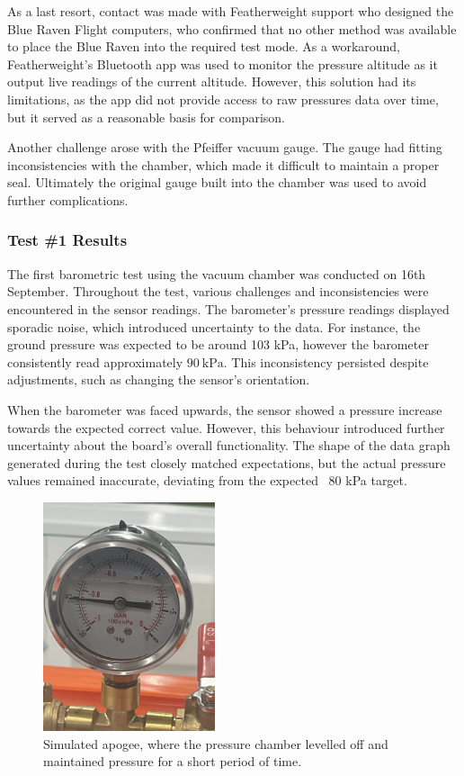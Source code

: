 As a last resort, contact was made with Featherweight support who designed the Blue Raven Flight computers, who confirmed that no other method was available to place the Blue Raven into the required test mode. As a workaround, Featherweight’s Bluetooth app was used to monitor the pressure altitude as it output live readings of the current altitude. However, this solution had its limitations, as the app did not provide access to raw pressures data over time, but it served as a reasonable basis for comparison.  

Another challenge arose with the Pfeiffer vacuum gauge. The gauge had fitting inconsistencies with the chamber, which made it difficult to maintain a proper seal. Ultimately the original gauge built into the chamber was used to avoid further complications.

\subsubsection{Test \#1 Results}
The first barometric test using the vacuum chamber was conducted on 16th September. Throughout the test, various challenges and inconsistencies were encountered in the sensor readings. The barometer's pressure readings displayed sporadic noise, which introduced uncertainty to the data. For instance, the ground pressure was expected to be around 103 kPa, however the barometer consistently read approximately $\qty{90}{\kilo\pascal}$. This inconsistency persisted despite adjustments, such as changing the sensor’s orientation. 

When the barometer was faced upwards, the sensor showed a pressure increase towards the expected correct value. However, this behaviour introduced further uncertainty about the board's overall functionality. The shape of the data graph generated during the test closely matched expectations, but the actual pressure values remained inaccurate, deviating from the expected ~80 kPa target. 

\begin{figure}[h]
    \begin{center}
        \includegraphics[width=0.45\textwidth]{./img/gauge.png}
    \end{center}
    \caption{Simulated apogee, where the pressure chamber levelled off and maintained pressure for a short period of time.}\label{fig:gauge}
\end{figure}

